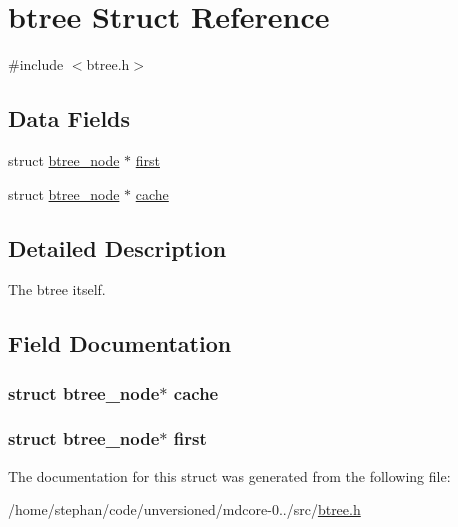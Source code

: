 \hypertarget{structbtree}{\section{btree Struct Reference}
\label{structbtree}
}


{\ttfamily \#include $<$btree.\-h$>$}

\subsection*{Data Fields}
\begin{DoxyCompactItemize}
\item 
struct \hyperlink{structbtree__node}{btree\-\_\-node} $\ast$ \hyperlink{structbtree_a4a61a21310d24f66cb6718dc213819a3}{first}
\item 
struct \hyperlink{structbtree__node}{btree\-\_\-node} $\ast$ \hyperlink{structbtree_a240ef27e120ab4682d1d39b938869964}{cache}
\end{DoxyCompactItemize}


\subsection{Detailed Description}
The btree itself. 

\subsection{Field Documentation}
\hypertarget{structbtree_a240ef27e120ab4682d1d39b938869964}{
\subsubsection[{cache}]{\setlength{\rightskip}{0pt plus 5cm}struct {\bf btree\-\_\-node}$\ast$ cache}}\label{structbtree_a240ef27e120ab4682d1d39b938869964}
\hypertarget{structbtree_a4a61a21310d24f66cb6718dc213819a3}{
\subsubsection[{first}]{\setlength{\rightskip}{0pt plus 5cm}struct {\bf btree\-\_\-node}$\ast$ first}}\label{structbtree_a4a61a21310d24f66cb6718dc213819a3}


The documentation for this struct was generated from the following file\-:\begin{DoxyCompactItemize}
\item 
/home/stephan/code/unversioned/mdcore-\/0../src/\hyperlink{btree_8h}{btree.\-h}\end{DoxyCompactItemize}
